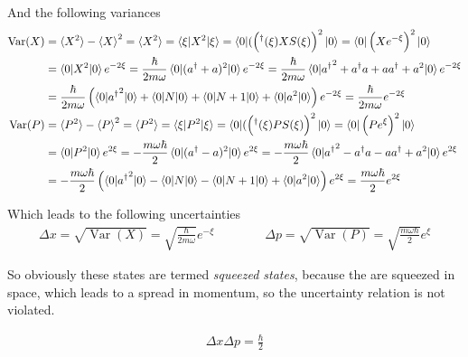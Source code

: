 \documentclass[a4paper,german,12pt,smallheadings]{scrartcl}
\begin{document}
\begin{enumerate}[a)]
    And the following variances
    \begin{align*}
      \operatorname{Var}(X)
      &= \braket{X^2} - \braket{X}^2
      = \braket{X^2}
      = \braket{\xi|X^2|\xi}
      = \braket{0|(\del{^\dagger(\xi)XS(\xi)}^2|0}
      = \braket{0|\del{Xe^{-\xi}}^2|0} \\
      &= \braket{0|X^2|0} e^{-2\xi}
      = \frac{\hbar}{2 m \omega} \braket{0|(a^\dagger + a)^2|0} e^{-2\xi}
      = \frac{\hbar}{2 m \omega} \braket{0|{a^\dagger}^2 + a^\dagger a + aa^\dagger + a^2|0} e^{-2\xi} \\
      &= \frac{\hbar}{2 m \omega} \del{\braket{0|{a^\dagger}^2|0} + \braket{0|N|0} + \braket{0|N+1|0} + \braket{0|a^2|0}} e^{-2\xi}
      = \frac{\hbar}{2 m \omega} e^{-2 \xi} \\
      \operatorname{Var}(P)
      &= \braket{P^2} - \braket{P}^2
      = \braket{P^2}
      = \braket{\xi|P^2|\xi}
      = \braket{0|(\del{^\dagger(\xi)PS(\xi)}^2|0}
      = \braket{0|\del{Pe^{\xi}}^2|0} \\
      &= \braket{0|P^2|0} e^{2\xi}
      = -\frac{m \omega \hbar}{2} \braket{0|(a^\dagger - a)^2|0} e^{2\xi}
      = -\frac{m \omega \hbar}{2} \braket{0|{a^\dagger}^2 - a^\dagger a - aa^\dagger + a^2|0} e^{2\xi} \\
      &= -\frac{m \omega \hbar}{2} \del{\braket{0|{a^\dagger}^2|0} - \braket{0|N|0} - \braket{0|N+1|0} + \braket{0|a^2|0}} e^{2\xi}
      = \frac{m \omega \hbar}{2} e^{2 \xi} \\
    \end{align*}

    Which leads to the following uncertainties
    \begin{align*}
      \Delta x = \sqrt{\operatorname{Var}(X)} = \sqrt{\frac{\hbar}{2 m \omega}} e^{-\xi}
      \qquad\qquad
      \Delta p = \sqrt{\operatorname{Var}(P)} = \sqrt{\frac{m \omega \hbar}{2}} e^{\xi}
    \end{align*}

    So obviously these states are termed \textit{squeezed states}, because the
    are squeezed in space, which leads to a spread in momentum, so the
    uncertainty relation is not violated.

    \begin{align*}
      \Delta x \Delta p = \frac{\hbar}{2}
    \end{align*}
\end{enumerate}
\end{document}
